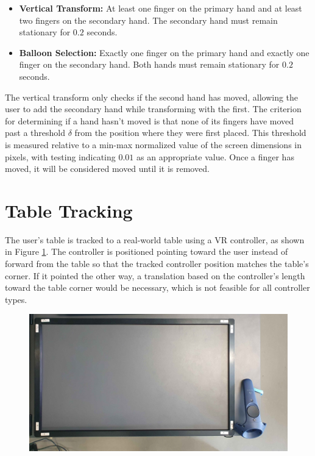         \begin{itemize}
            \item \textbf{Vertical Transform:} At least one finger on the primary hand and at least two fingers on the secondary hand. The secondary hand must remain stationary for $0.2$ seconds.
            \item \textbf{Balloon Selection:} Exactly one finger on the primary hand and exactly one finger on the secondary hand. Both hands must remain stationary for $0.2$ seconds.
        \end{itemize}
    
        The vertical transform only checks if the second hand has moved, allowing the user to add the secondary hand while transforming with the first. The criterion for determining if a hand hasn't moved is that none of its fingers have moved past a threshold $\delta$ from the position where they were first placed. This threshold is measured relative to a min-max normalized value of the screen dimensions in pixels, with testing indicating $0.01$ as an appropriate value. Once a finger has moved, it will be considered moved until it is removed.

\section{Table Tracking} \label{sec:table_tracking}

    The user's table is tracked to a real-world table using a VR controller, as shown in Figure \ref{fig:table_tracking}. The controller is positioned pointing toward the user instead of forward from the table so that the tracked controller position matches the table's corner. If it pointed the other way, a translation based on the controller's length toward the table corner would be necessary, which is not feasible for all controller types.

    \begin{figure}[h]
        \centering
        \includegraphics[width=1\textwidth]{figures/table_tracking.jpg}
        \label{fig:table_tracking}
    \end{figure}

